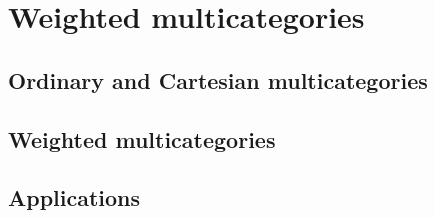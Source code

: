 \chapter{Weighted multicategories}\label{sec:weighted-multicategories}

\section{Ordinary and Cartesian multicategories}

\section{Weighted multicategories}

\section{Applications}
